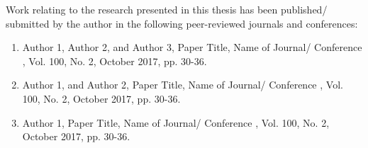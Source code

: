 \begin{publications} 
Work relating to the research presented in this thesis has been published/ submitted by the author in the following peer-reviewed journals and conferences:

\begin{enumerate} 

\item Author 1, Author 2, and Author 3, Paper Title, Name of Journal/ Conference , Vol. 100, No. 2, October 2017, pp. 30-36.

\item Author 1, and Author 2, Paper Title, Name of Journal/ Conference , Vol. 100, No. 2, October 2017, pp. 30-36.

\item Author 1, Paper Title, Name of Journal/ Conference , Vol. 100, No. 2, October 2017, pp. 30-36.

\end{enumerate}

\end{publications}
